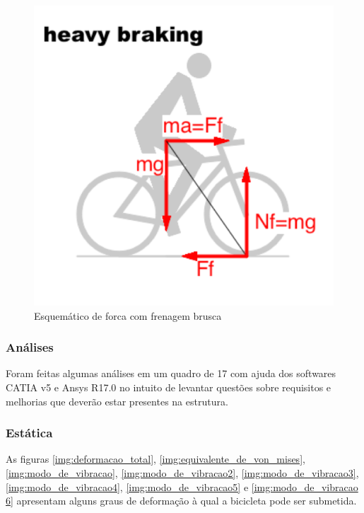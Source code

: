 		\graphicspath{{figuras/}}
		\begin{figure}[H]
		\centering
		\includegraphics[scale=0.80]{esq_forca_com_frenagem_brusca.png}
		\caption{Esquemático de forca com frenagem brusca}
		\label{img:esq_forca_com_frenagem_brusca}
		\end{figure}


	\subsubsection{Análises}
	Foram feitas algumas análises em um quadro de 17 com ajuda dos softwares CATIA v5 e Ansys R17.0 no intuito de levantar questões sobre requisitos e melhorias que deverão estar presentes na estrutura.
	
	\subsubsection{Estática}
	As figuras \ref{img:deformacao_total}, \ref{img:equivalente_de_von_mises}, \ref{img:modo_de_vibracao}, \ref{img:modo_de_vibracao2}, \ref{img:modo_de_vibracao3}, \ref{img:modo_de_vibracao4}, \ref{img:modo_de_vibracao5} e \ref{img:modo_de_vibracao 6} apresentam alguns graus de deformação à qual a bicicleta pode ser submetida. 	
	
